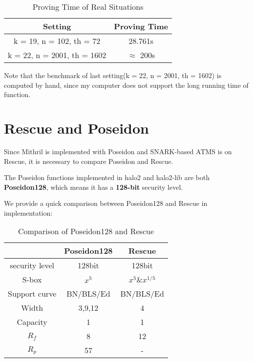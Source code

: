 \documentclass{article}
\begin{document}
\begin{table}[H]
    \centering
    \begin{tabular}{c|c} \hline
        Setting & Proving Time \\ \hline
         k = 19, n = 102, th = 72& 28.761s  \\ \hline
         k = 22, n = 2001, th = 1602 & $\approx$ 200s \\ \hline
    \end{tabular}
    \caption{Proving Time of Real Situations}
    \label{tab:my_label}
\end{table}


Note that the benchmark of last setting(k = 22, n = 2001, th = 1602) is computed by hand, since my computer does not support the long running time of function.




\section{Rescue and Poseidon}

Since Mithril is implemented with Poseidon and SNARK-based ATMS is on Rescue, it is necessary to compare Poseidon and Rescue.

The Poseidon functions implemented in halo2 and halo2-lib are both \textbf{Poseidon128}, which means it has a \textbf{128-bit} security level.

We provide a quick comparison between Poseidon128 and Rescue in implementation:

\begin{table}[H]
    \centering
    \begin{tabular}{c|c|c} \hline
         &Poseidon128& Rescue  \\ \hline
         security level& 128bit&128bit \\ \hline
         S-box & $x^5$& $x^5$\&$x^{1/5}$ \\ \hline
         Support curve& BN/BLS/Ed& BN/BLS/Ed \\ \hline
         Width&  3,9,12 &4 \\ \hline
         Capacity& 1 & 1 \\ \hline
         $R_f$ &8 & 12 \\ \hline
         $R_p$&57& - \\ \hline
    \end{tabular}
    \caption{Comparison of Poseidon128 and Rescue}
    \label{tab:my_label}
\end{table}
\end{document}
